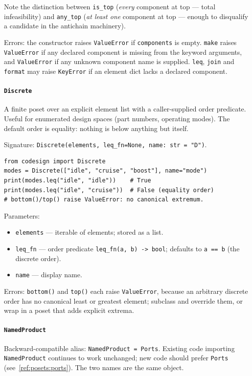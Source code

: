 \documentclass[11pt,a4paper]{article}
\begin{document}
Note the distinction between \texttt{is\_top} (\emph{every} component at
top --- total infeasibility) and \texttt{any\_top} (\emph{at least one}
component at top --- enough to disqualify a candidate in the antichain
machinery).

Errors: the constructor raises \texttt{ValueError} if \texttt{components}
is empty. \texttt{make} raises \texttt{ValueError} if any declared
component is missing from the keyword arguments, and \texttt{ValueError}
if any unknown component name is supplied. \texttt{leq}, \texttt{join} and
\texttt{format} may raise \texttt{KeyError} if an element dict lacks a
declared component.

\paragraph{\texttt{Discrete}}
\label{ref:posets:discrete}
A finite poset over an explicit element list with a caller-supplied order
predicate. Useful for enumerated design spaces (part numbers, operating
modes). The default order is equality: nothing is below anything but
itself.

Signature: \texttt{Discrete(elements, leq\_fn=None, name: str = "D")}.

\begin{lstlisting}
from codesign import Discrete
modes = Discrete(["idle", "cruise", "boost"], name="mode")
print(modes.leq("idle", "idle"))    # True
print(modes.leq("idle", "cruise"))  # False (equality order)
# bottom()/top() raise ValueError: no canonical extremum.
\end{lstlisting}

Parameters:
\begin{itemize}[nosep]
\item \texttt{elements} --- iterable of elements; stored as a list.
\item \texttt{leq\_fn} --- order predicate \texttt{leq\_fn(a, b) -> bool};
  defaults to \texttt{a == b} (the discrete order).
\item \texttt{name} --- display name.
\end{itemize}

Errors: \texttt{bottom()} and \texttt{top()} each raise
\texttt{ValueError}, because an arbitrary discrete order has no canonical
least or greatest element; subclass and override them, or wrap in a poset
that adds explicit extrema.

\paragraph{\texttt{NamedProduct}}
\label{ref:posets:namedproduct}
Backward-compatible alias: \texttt{NamedProduct = Ports}. Existing code
importing \texttt{NamedProduct} continues to work unchanged; new code
should prefer \texttt{Ports} (see~\ref{ref:posets:ports}). The two names
are the same object.
\end{document}
